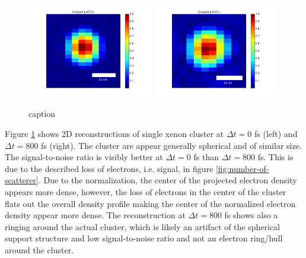 \begin{figure}
	\centering
		\includegraphics[width=0.49\textwidth]{images/results/Xe_0_fs.png}
		\includegraphics[width=0.49\textwidth]{images/results/Xe_800_fs.png}
	\caption{caption}
	\label{fig:Xe-2D-reconstructions}
\end{figure}
Figure \ref{fig:Xe-2D-reconstructions} shows 2D reconstructions of single xenon cluster at $\Delta t = 0$ fs (left) and $\Delta t=800$ fs (right). The cluster are appear generally spherical and of similar size. The signal-to-noise ratio is visibly better at $\Delta t=0$ fs than $\Delta t=800$ fs. This is due to the described loss of electrons, i.e. signal, in figure \ref{fig:number-of-scatterer}. Due to the normalization, the center of the projected electron density appears more dense, however, the loss of electrons in the center of the cluster flats out the overall density profile making the center of the normalized electron density appear more dense. The reconstruction at $\Delta t=800$ fs shows also a ringing around the actual cluster, which is likely an artifact of the spherical support structure and low signal-to-noise ratio and not an electron ring/hull around the cluster.
%
%
%
